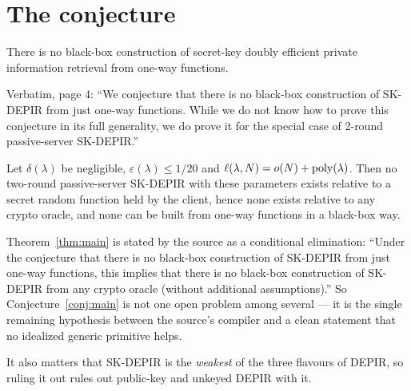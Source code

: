 \documentclass{aicr-conjecture}
\begin{document}
\section{The conjecture}\label{sec:conjectures}

\begin{conjecture}\label{conj:main}
There is no black-box construction of secret-key doubly efficient private
information retrieval from one-way functions.
\end{conjecture}

\begin{remark}\label{rem:framing}
Verbatim, page 4: ``We conjecture that there is no black-box construction
of SK-DEPIR from just one-way functions. While we do not know how to
prove this conjecture in its full generality, we do prove it for the
special case of 2-round passive-server SK-DEPIR.''
\end{remark}

\begin{theorem}\label{thm:special}
Let $\delta(\lambda)$ be negligible, $\varepsilon(\lambda) \le 1/20$ and
$\ell(\lambda,N) = o(N) + \mathrm{poly}(\lambda)$. Then no two-round
passive-server SK-DEPIR with these parameters exists relative to a secret
random function held by the client, hence none exists relative to any
crypto oracle, and none can be built from one-way functions in a
black-box way.
\end{theorem}

\begin{remark}\label{rem:why}
Theorem~\ref{thm:main} is stated by the source as a conditional
elimination: ``Under the conjecture that there is no black-box
construction of SK-DEPIR from just one-way functions, this implies that
there is no black-box construction of SK-DEPIR from any crypto oracle
(without additional assumptions).'' So Conjecture~\ref{conj:main} is not
one open problem among several --- it is the single remaining hypothesis
between the source's compiler and a clean statement that no idealized
generic primitive helps.

It also matters that SK-DEPIR is the \emph{weakest} of the three flavours
of DEPIR, so ruling it out rules out public-key and unkeyed DEPIR with
it.
\end{remark}
\end{document}
